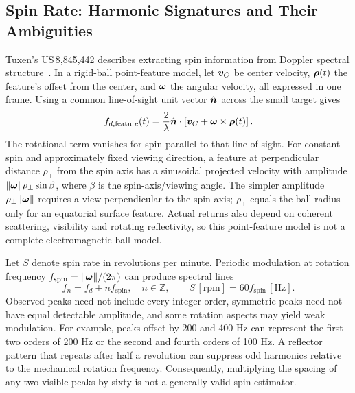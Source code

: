 \subsection{Spin Rate: Harmonic Signatures and Their Ambiguities}
\label{sec:radarspin}

Tuxen's US\,8,845,442 describes extracting spin information from Doppler spectral structure~\cite{us8845442}.
In a rigid-ball point-feature model, let $\bm{v}_C$ be center velocity, $\bm{\rho}(t)$ the feature's offset from the center, and $\bm{\omega}$ the angular velocity, all expressed in one frame.
Using a common line-of-sight unit vector $\hat{\bm{n}}$ across the small target gives
\begin{equation}
\label{eq:radarfeature}
f_{d,\mathrm{feature}}(t)=\frac{2}{\lambda}
\hat{\bm{n}}\cdot\left[\bm{v}_C+\bm{\omega}\times\bm{\rho}(t)\right].
\end{equation}
The rotational term vanishes for spin parallel to that line of sight.
For constant spin and approximately fixed viewing direction, a feature at perpendicular distance $\rho_\perp$ from the spin axis has a sinusoidal projected velocity with amplitude $\lVert\bm{\omega}\rVert\rho_\perp\sin\beta$, where $\beta$ is the spin-axis/viewing angle.
The simpler amplitude $\rho_\perp\lVert\bm{\omega}\rVert$ requires a view perpendicular to the spin axis; $\rho_\perp$ equals the ball radius only for an equatorial surface feature.
Actual returns also depend on coherent scattering, visibility and rotating reflectivity, so this point-feature model is not a complete electromagnetic ball model.

Let $S$ denote spin rate in revolutions per minute.
Periodic modulation at rotation frequency $f_{\mathrm{spin}}=\lVert\bm{\omega}\rVert/(2\pi)$ can produce spectral lines
\begin{equation}
\label{eq:sidebands}
f_n=f_d+n f_{\mathrm{spin}},\quad n\in\mathbb Z,
\qquad S\,[\mathrm{rpm}]=60 f_{\mathrm{spin}}\,[\mathrm{Hz}].
\end{equation}
Observed peaks need not include every integer order, symmetric peaks need not have equal detectable amplitude, and some rotation aspects may yield weak modulation.
For example, peaks offset by 200 and 400 Hz can represent the first two orders of 200 Hz or the second and fourth orders of 100 Hz.
A reflector pattern that repeats after half a revolution can suppress odd harmonics relative to the mechanical rotation frequency.
Consequently, multiplying the spacing of any two visible peaks by sixty is not a generally valid spin estimator.

